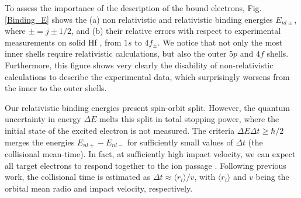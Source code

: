 \documentclass[aps,prb,reprint,groupedaddress]{revtex4-1}
\begin{document}
To assess the importance of the description of the bound electrons, Fig. \ref{Binding_E} shows the (a) non relativistic and relativistic binding energies\cite{mendez2019}  $E_{nl\pm}$, where $\pm=j\pm1/2$, and (b) their relative errors with respect to experimental measurements on solid Hf \cite{williams1995}, from $1s$ to $4f_{\pm}$. 
We notice that not only the most inner shells require relativistic calculations, but also the outer $5p$ and $4f$ shells. 
Furthermore, this figure shows very clearly the disability of non-relativistic calculations to describe the experimental data, which surprisingly worsens from the inner to the outer shells. 

Our relativistic binding energies present spin-orbit split. 
However, the quantum uncertainty in energy $\Delta E$ melts this split in total stopping power, where the initial state of the excited electron is not measured. 
The criteria $\Delta E\Delta t \geq \hbar /2$ merges the energies  $E_{nl+} - E_{nl-}$ for sufficiently small values of $\Delta t$ (the collisional mean-time). 
In fact, at sufficiently high impact velocity, we can expect all target electrons to respond together to the ion passage \cite{lindhard53,chu72}. 
Following previous work\cite{mon09}, the collisional time is estimated as $\Delta t \approx \langle r_i\rangle/v$, with $\langle r_i\rangle$ and $v$ being the orbital mean radio and impact velocity, respectively. 
\end{document}
